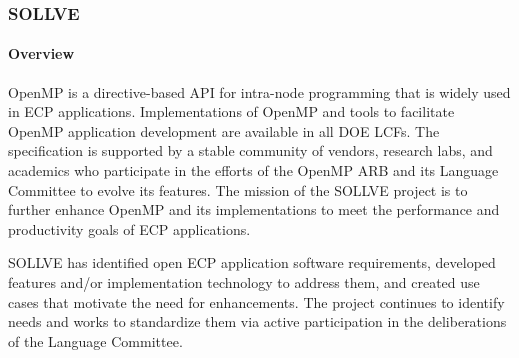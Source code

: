 \subsubsection{SOLLVE}\label{subsubsect:sollve}



\paragraph{Overview}
OpenMP is a directive-based API for intra-node programming that is widely used  in ECP applications. Implementations of OpenMP and  tools to facilitate OpenMP application development are available in all DOE LCFs.  
The specification is supported by a stable community of vendors, research labs, and academics who
participate in the efforts of the  OpenMP ARB and its Language Committee to evolve its features.
The mission of the SOLLVE project is to further enhance  OpenMP and its implementations to meet the performance and productivity goals of ECP applications. 

SOLLVE has identified open ECP application software requirements, developed features and/or implementation technology to address them, and created use cases that motivate the need for enhancements. 
 The project continues to identify needs and works to standardize them via 
active participation in the deliberations of the Language Committee.  


